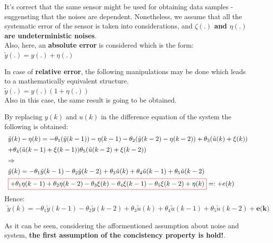 \begin{factbox}
It's correct that the same sensor might be used for obtaining data samples - suggensting that the noises are dependent. Nonetheless, we assume that all the systematic error of the sensor is taken into considerations, and \textbf{\(\zeta(.)\) and \(\eta(.)\) are undeterministic noises}.\\

Also, here, an \textbf{absolute error} is considered which is the form:\\
\(\tilde{y}(.) = y(.) + \eta(.)\)
\end{factbox}
\newpage
\begin{factbox}
In case of \textbf{relative error}, the following manipulations may be done which leads to a mathematically equivalent structure.\\
\(\tilde{y}(.) = y(.)(1 + \eta(.))\)\\
Also in this case, the same result is going to be obtained.
\end{factbox}
By replacing \(y(k)\) and \(u(k)\) in the difference equation of the system the following is obtained:
\[
\begin{array}{l}
\tilde{y}(k) - \eta(k) = -\theta_1(\tilde{y}(k-1)) - \eta(k-1) -\theta_2(\tilde{y}(k-2) - \eta(k-2)) + \theta_3(\tilde{u}(k) + \xi(k)) \\[1ex] 
+ \theta_4(\tilde{u}(k-1) + \xi(k-1))
 \theta_5(\tilde{u}(k-2) + \xi(k-2)) \\[1ex] 
\Rightarrow \\[1ex]
\tilde{y}(k)= -\theta_1 \tilde{y}(k - 1) - \theta_2 \tilde{y}(k - 2) + \theta_3 \tilde{u}(k) + \theta_4 \tilde{u}(k - 1) + \theta_5 \tilde{u}(k - 2) \\[1ex]
\textcolor{red}{\fbox{\textcolor{black}{$+ \theta_1\eta(k-1) + \theta_2\eta(k-2) - \theta_3\xi(k) - \theta_4\xi(k-1) - \theta_5\xi(k-2) + \eta(k) $}}} =: + e(k) \\
\end{array}
\]
Hence:
\begin{equation}
\begin{array}{l}
\tilde{y}(k)= -\theta_1 \tilde{y}(k - 1) - \theta_2 \tilde{y}(k - 2) + \theta_3 \tilde{u}(k) + \theta_4 \tilde{u}(k - 1) + \theta_5 \tilde{u}(k - 2) + \textbf{e(k)}
\end{array}
\end{equation}

As it can be seen, considering the afformentioned assumption about noise and system, \textbf{the first assumption of the concistency property is hold!}.\\

